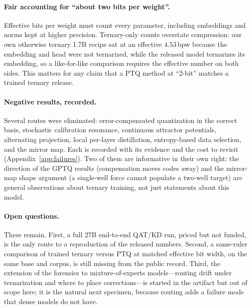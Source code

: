 \paragraph{Fair accounting for ``about two bits per weight''.}
Effective bits per weight must count every parameter, including embeddings and
norms kept at higher precision. Ternary-only counts overstate compression: our
own otherwise ternary 1.7B recipe sat at an effective $4.53$\,bpw because the
embedding and head were not ternarized, while the released model ternarizes its
embedding, so a like-for-like comparison requires the effective number on both
sides. This matters for any claim that a PTQ method at ``2-bit'' matches a
trained ternary release.

\paragraph{Negative results, recorded.}
Several routes were eliminated: error-compensated quantization in the correct
basis, stochastic calibration resonance, continuous attractor potentials,
alternating projection, local per-layer distillation, entropy-based data
selection, and the mirror map. Each is recorded with its evidence and the cost
to revisit (Appendix~\ref{app:failures}). Two of them are informative in their
own right: the direction of the GPTQ results (compensation moves codes away)
and the mirror-map shape argument (a single-well force cannot populate a
two-well target) are general observations about ternary training, not just
statements about this model.

\paragraph{Open questions.}
Three remain. First, a full 27B end-to-end QAT/KD run, priced but not funded,
is the only route to a reproduction of the released numbers. Second, a
same-ruler comparison of trained ternary versus PTQ at matched effective bit
width, on the same base and corpus, is still missing from the public record.
Third, the extension of the forensics to mixture-of-experts models---routing
drift under ternarization and where to place corrections---is started in the
artifact but out of scope here; it is the natural next specimen, because
routing adds a failure mode that dense models do not have.
